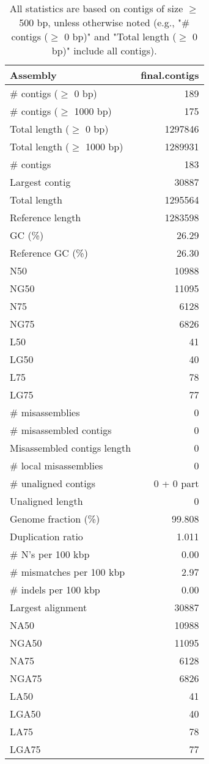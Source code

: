 \documentclass[12pt,a4paper]{article}
\begin{document}
\begin{table}[ht]
\begin{center}
\caption{All statistics are based on contigs of size $\geq$ 500 bp, unless otherwise noted (e.g., "\# contigs ($\geq$ 0 bp)" and "Total length ($\geq$ 0 bp)" include all contigs).}
\begin{tabular}{|l*{1}{|r}|}
\hline
Assembly & final.contigs \\ \hline
\# contigs ($\geq$ 0 bp) & 189 \\ \hline
\# contigs ($\geq$ 1000 bp) & 175 \\ \hline
Total length ($\geq$ 0 bp) & 1297846 \\ \hline
Total length ($\geq$ 1000 bp) & 1289931 \\ \hline
\# contigs & 183 \\ \hline
Largest contig & 30887 \\ \hline
Total length & 1295564 \\ \hline
Reference length & 1283598 \\ \hline
GC (\%) & 26.29 \\ \hline
Reference GC (\%) & 26.30 \\ \hline
N50 & 10988 \\ \hline
NG50 & 11095 \\ \hline
N75 & 6128 \\ \hline
NG75 & 6826 \\ \hline
L50 & 41 \\ \hline
LG50 & 40 \\ \hline
L75 & 78 \\ \hline
LG75 & 77 \\ \hline
\# misassemblies & 0 \\ \hline
\# misassembled contigs & 0 \\ \hline
Misassembled contigs length & 0 \\ \hline
\# local misassemblies & 0 \\ \hline
\# unaligned contigs & 0 + 0 part \\ \hline
Unaligned length & 0 \\ \hline
Genome fraction (\%) & 99.808 \\ \hline
Duplication ratio & 1.011 \\ \hline
\# N's per 100 kbp & 0.00 \\ \hline
\# mismatches per 100 kbp & 2.97 \\ \hline
\# indels per 100 kbp & 0.00 \\ \hline
Largest alignment & 30887 \\ \hline
NA50 & 10988 \\ \hline
NGA50 & 11095 \\ \hline
NA75 & 6128 \\ \hline
NGA75 & 6826 \\ \hline
LA50 & 41 \\ \hline
LGA50 & 40 \\ \hline
LA75 & 78 \\ \hline
LGA75 & 77 \\ \hline
\end{tabular}
\end{center}
\end{table}
\end{document}
